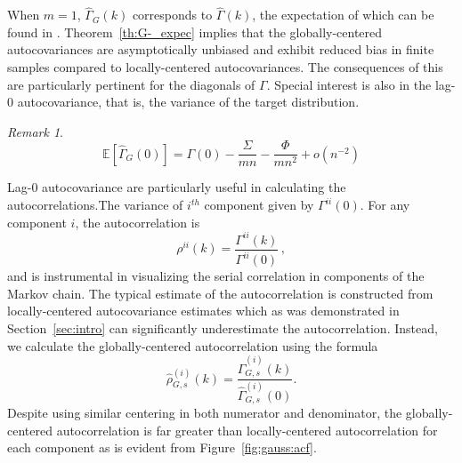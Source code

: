 \documentclass[11pt]{article}
\theoremstyle{remark}
\newtheorem{remark}{Remark}
\begin{document}
When $m = 1$, $\hat{\Gamma}_G(k)$ corresponds to $\hat{\Gamma}(k)$, the expectation of which can be found in \cite{priestley1981spectral}. Theorem~\ref{th:G-_expec} implies that the globally-centered autocovariances are asymptotically unbiased and exhibit reduced bias in finite samples compared to locally-centered autocovariances. The consequences of this are particularly pertinent for the diagonals of $\Gamma$. Special interest is also in the lag-0 autocovariance, that is, the variance of the target distribution. 


\begin{remark} \label{rem:lag0_expectation}
\[
\mathbb{E} \left[\hat{\Gamma}_{G}(0) \right] = \Gamma(0) - \dfrac{\Sigma}{mn} - \dfrac{\Phi}{mn^2} + o(n^{-2})
\]

\end{remark}



Lag-0 autocovariance are particularly useful in calculating the autocorrelations.The variance of $i^{th}$ component given by $\Gamma^{ii}(0)$. For any component $i$, the autocorrelation is
\[
\rho^{ii}(k) = \dfrac{\Gamma^{ii}(k)}{\Gamma^{ii}(0)}\,,
\]
and is instrumental in visualizing the serial correlation in components of the Markov chain. The typical estimate of the autocorrelation is constructed from  locally-centered autocovariance estimates which as was demonstrated in Section~\ref{sec:intro} can significantly underestimate the autocorrelation. Instead, we calculate the globally-centered autocorrelation using the formula
\[
\hat{\rho}_{G,s}^{(i)}(k) = \dfrac{ \hat{\Gamma}^{(i)}_{G,s} (k)}{\hat{\Gamma}^{(i)}_{G,s} (0)}.
\]
Despite using similar centering in both numerator and denominator, the globally-centered autocorrelation is far greater than locally-centered autocorrelation for each component as is evident from Figure~\ref{fig:gauss:acf}. 

\end{document}
